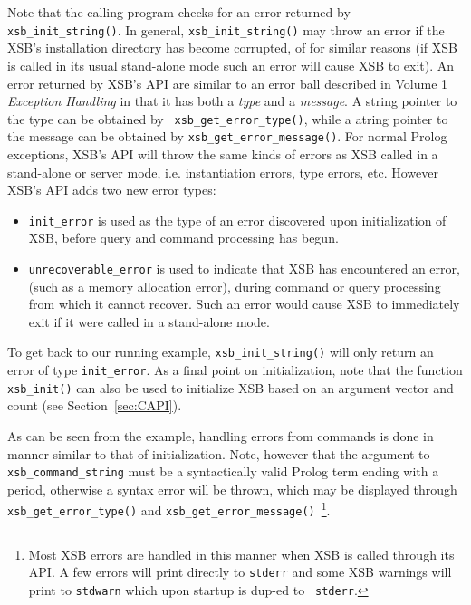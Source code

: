 Note that the calling program checks for an error returned by {\tt
  xsb\_init\_string()}.  In general, {\tt xsb\_init\_string()} may
throw an error if the XSB's installation directory has become
corrupted, of for similar reasons (if XSB is called in its usual
stand-alone mode such an error will cause XSB to exit).  An error
returned by XSB's API are similar to an error ball described in Volume
1 {\em Exception Handling} in that it has both a {\em type} and a {\em
  message}.  A string pointer to the type can be obtained by {\tt
  xsb\_get\_error\_type()}, while a atring pointer to the message can
be obtained by {\tt xsb\_get\_error\_message()}.  For normal Prolog
exceptions, XSB's API will throw the same kinds of errors as XSB
called in a stand-alone or server mode, i.e. instantiation errors,
type errors, etc.  However XSB's API adds two new error types:
%
\begin{itemize}
\item {\tt init\_error} is used as the type of an error discovered
  upon initialization of XSB, before query and command processing has
  begun.
%
\item {\tt unrecoverable\_error} is used to indicate that XSB has
  encountered an error, (such as a memory allocation error), during
  command or query processing from which it cannot recover.  Such an
  error would cause XSB to immediately exit if it were called in a
  stand-alone mode.
\end{itemize}
%
To get back to our running example, {\tt xsb\_init\_string()} will
only return an error of type {\tt init\_error}.  As a final point on
initialization, note that the function {\tt xsb\_init()} can also be
used to initialize XSB based on an argument vector and count (see
Section~\ref{sec:CAPI}).

As can be seen from the example, handling errors from commands is done
in manner similar to that of initialization.  Note, however that the
argument to {\tt xsb\_command\_string} must be a syntactically valid
Prolog term ending with a period, otherwise a syntax error will be
thrown, which may be displayed through {\tt xsb\_get\_error\_type()}
and {\tt xsb\_get\_error\_message()}~\footnote{Most XSB errors are
  handled in this manner when XSB is called through its API.  A few
  errors will print directly to {\tt stderr} and some XSB warnings
  will print to {\tt stdwarn} which upon startup is dup-ed to {\tt
    stderr}.}.

